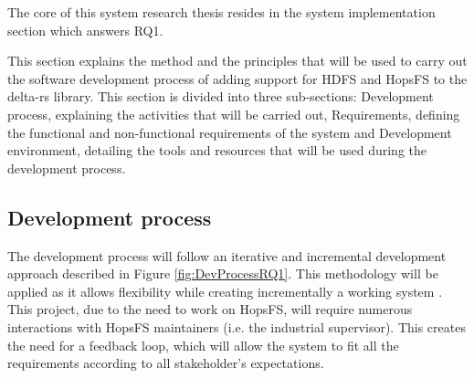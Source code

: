 The core of this system research thesis resides in the system implementation section which answers RQ1.

This section explains the method and the principles that will be used to carry out the software development process of adding support for \gls{HDFS} and \gls{HopsFS} to the delta-rs library. This section is divided into three sub-sections: Development process, explaining the activities that will be carried out, Requirements, defining the functional and non-functional requirements of the system and Development environment, detailing the tools and resources that will be used during the development process.

\subsection{Development process}
The development process will follow an iterative and incremental development approach described in Figure \ref{fig:DevProcessRQ1}. This methodology will be applied as it allows flexibility while creating incrementally a working system \cite{despa2014comparative}. This project, due to the need to work on \gls{HopsFS}, will require numerous interactions with \gls{HopsFS} maintainers (i.e. the industrial supervisor). This creates the need for a feedback loop, which will allow the system to fit all the requirements according to all stakeholder's expectations.

